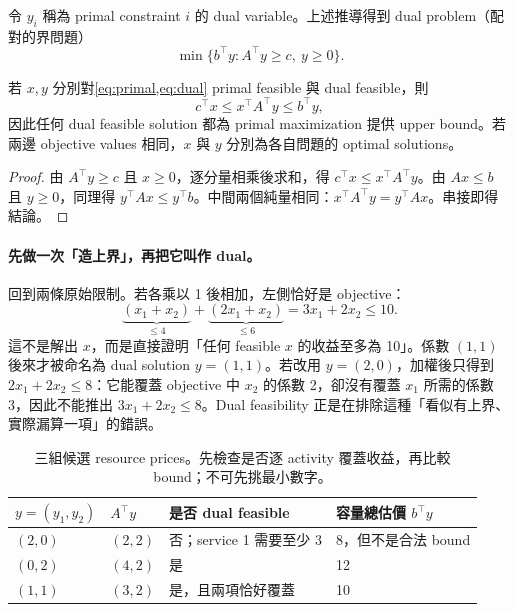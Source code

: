 \documentclass[11pt,a4paper,oneside,openany]{book}
\begin{document}
令 $y_i$ 稱為 primal constraint $i$ 的 dual variable。上述推導得到 dual problem（配對的界問題）
\begin{equation}
 \min\{b^\top y:A^\top y\ge c,\ y\ge0\}.
 \label{eq:dual}
\end{equation}
\begin{theorem}
若 $x,y$ 分別對\cref{eq:primal,eq:dual} primal feasible 與 dual feasible，則
\[
 c^\top x\le x^\top A^\top y\le b^\top y,
\]
因此任何 dual feasible solution 都為 primal maximization 提供 upper bound。若兩邊 objective values 相同，$x$ 與 $y$ 分別為各自問題的 optimal solutions。
\end{theorem}
\begin{proof}
由 $A^\top y\ge c$ 且 $x\ge0$，逐分量相乘後求和，得 $c^\top x\le x^\top A^\top y$。由 $Ax\le b$ 且 $y\ge0$，同理得 $y^\top Ax\le y^\top b$。中間兩個純量相同：$x^\top A^\top y=y^\top Ax$。串接即得結論。
\end{proof}

\paragraph{先做一次「造上界」，再把它叫作 dual。}
回到兩條原始限制。若各乘以 1 後相加，左側恰好是 objective：
\[
 \underbrace{(x_1+x_2)}_{\le4}
 +\underbrace{(2x_1+x_2)}_{\le6}
 =3x_1+2x_2\le10.
\]
這不是解出 $x$，而是直接證明「任何 feasible $x$ 的收益至多為 10」。係數 $(1,1)$ 後來才被命名為 dual solution $y=(1,1)$。若改用 $y=(2,0)$，加權後只得到 $2x_1+2x_2\le8$：它能覆蓋 objective 中 $x_2$ 的係數 2，卻沒有覆蓋 $x_1$ 所需的係數 3，因此不能推出 $3x_1+2x_2\le8$。Dual feasibility 正是在排除這種「看似有上界、實際漏算一項」的錯誤。

\begin{table}[htbp]
\centering
\caption{三組候選 resource prices。先檢查是否逐 activity 覆蓋收益，再比較 bound；不可先挑最小數字。}
\label{tab:dual-price-attempts}
\begin{tabularx}{.94\textwidth}{@{}lYYY@{}}
\toprule
$y=(y_1,y_2)$ & $A^\top y$ & 是否 dual feasible & 容量總估價 $b^\top y$ \\
\midrule
$(2,0)$ & $(2,2)$ & 否；service 1 需要至少 3 & 8，但不是合法 bound \\
$(0,2)$ & $(4,2)$ & 是 & 12 \\
$(1,1)$ & $(3,2)$ & 是，且兩項恰好覆蓋 & 10 \\
\bottomrule
\end{tabularx}
\end{table}
\end{document}

